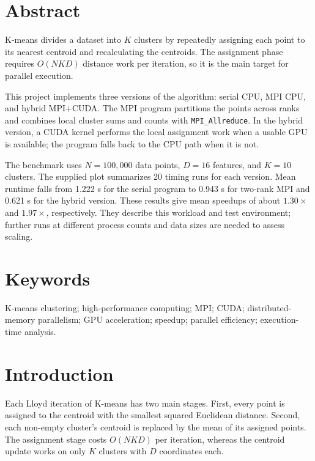 \documentclass[conference]{IEEEtran}
\DeclareRobustCommand{\code}[1]{\texttt{#1}}
\begin{document}
\clearpage
\onecolumn
\tableofcontents
\clearpage
\twocolumn

\section{Abstract}
\label{sec:abstract}
K-means divides a dataset into $K$ clusters by repeatedly assigning each point to its nearest centroid and recalculating the centroids. The assignment phase requires $O(NKD)$ distance work per iteration, so it is the main target for parallel execution.

This project implements three versions of the algorithm: serial CPU, MPI CPU, and hybrid MPI+CUDA. The MPI program partitions the points across ranks and combines local cluster sums and counts with \code{MPI\_Allreduce}. In the hybrid version, a CUDA kernel performs the local assignment work when a usable GPU is available; the program falls back to the CPU path when it is not.

The benchmark uses $N=100{,}000$ data points, $D=16$ features, and $K=10$ clusters. The supplied plot summarizes 20 timing runs for each version. Mean runtime falls from 1.222 s for the serial program to 0.943 s for two-rank MPI and 0.621 s for the hybrid version. These results give mean speedups of about $1.30\times$ and $1.97\times$, respectively. They describe this workload and test environment; further runs at different process counts and data sizes are needed to assess scaling.

\section{Keywords}
\label{sec:keywords}
K-means clustering; high-performance computing; MPI; CUDA; distributed-memory parallelism; GPU acceleration; speedup; parallel efficiency; execution-time analysis.

\section{Introduction}
\label{sec:intro}
Each Lloyd iteration of K-means has two main stages. First, every point is assigned to the centroid with the smallest squared Euclidean distance. Second, each non-empty cluster's centroid is replaced by the mean of its assigned points. The assignment stage costs $O(NKD)$ per iteration, whereas the centroid update works on only $K$ clusters with $D$ coordinates each.
\end{document}
